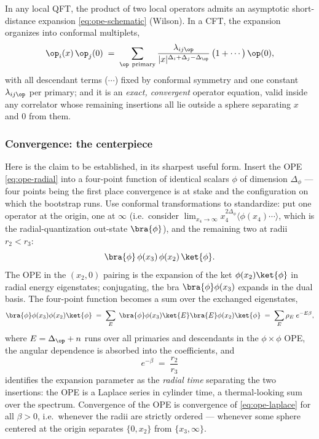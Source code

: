 \begin{ddefinition}
\label{def:ope}
In any local QFT, the product of two local operators admits an asymptotic
short-distance expansion \eqref{eq:ope-schematic} (Wilson). In a CFT, the
expansion organizes into conformal multiplets,
\begin{equation}
\op_i(x)\,\op_j(0) \;=\; \sum_{\op\ \rm primary}
\frac{\lambda_{ij\op}}{|x|^{\Delta_i+\Delta_j-\Delta_\op}}\,
\big(1 + \cdots\big)\,\op(0),
\end{equation}
with all descendant terms ($\cdots$) fixed by conformal symmetry and one
constant $\lambda_{ij\op}$ per primary; and it is an \emph{exact, convergent}
operator equation, valid inside any correlator whose remaining insertions all
lie outside a sphere separating $x$ and $0$ from them.
\end{ddefinition}

\subsubsection{Convergence: the centerpiece}
\label{sec:ope-convergence}

Here is the claim to be established, in its sharpest useful form. Insert the
OPE \eqref{eq:ope-radial} into a four-point function of identical scalars
$\phi$ of dimension $\Delta_\phi$ --- four points being the first place
convergence is at stake and the configuration on which the bootstrap runs.
Use conformal transformations to standardize: put one operator at the origin,
one at $\infty$ (i.e.\ consider $\lim_{x_4\to\infty} x_4^{2\Delta_\phi}
\langle \phi(x_4)\cdots\rangle$, which is the radial-quantization out-state
$\bra{\phi}$), and the remaining two at radii $r_2 < r_3$:
\begin{equation}
\bra{\phi}\,\phi(x_3)\,\phi(x_2)\,\ket{\phi}.
\label{eq:4pt-radial}
\end{equation}
The OPE in the $(x_2, 0)$ pairing is the expansion of the ket $\phi(x_2)
\ket{\phi}$ in radial energy eigenstates; conjugating, the bra
$\bra{\phi}\phi(x_3)$ expands in the dual basis. The four-point function
becomes a sum over the exchanged eigenstates,
\begin{equation}
\bra{\phi}\phi(x_3)\phi(x_2)\ket{\phi}
\;=\; \sum_{E} \;\bra{\phi}\phi(x_3)\ket{E}\bra{E}\phi(x_2)\ket{\phi}
\;=\; \sum_{E} \rho_E \; e^{-E \beta},
\label{eq:ope-laplace}
\end{equation}
where $E = \Delta_\op + n$ runs over all primaries and descendants in the
$\phi\times\phi$ OPE, the angular dependence is absorbed into the
coefficients, and
\begin{equation}
e^{-\beta} \;=\; \frac{r_2}{r_3}
\end{equation}
identifies the expansion parameter as the \emph{radial time} separating the
two insertions: the OPE is a Laplace series in cylinder time, a thermal-looking
sum over the spectrum. Convergence of the OPE is convergence of
\eqref{eq:ope-laplace} for all $\beta > 0$, i.e.\ whenever the radii are
strictly ordered --- whenever some sphere centered at the origin separates
$\{0, x_2\}$ from $\{x_3, \infty\}$.

